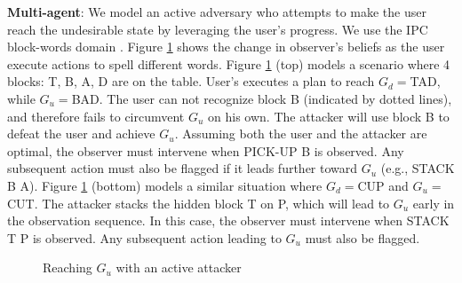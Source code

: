 \textbf{Multi-agent}: 
We model an active adversary who attempts to make the user reach the undesirable state by leveraging the user's progress. We use the IPC block-words domain  \cite{gupta1992bw}. Figure \ref{fig:multi} shows the change in observer's beliefs as the user execute actions to spell different words. Figure \ref{fig:multi} (top) models a  scenario where 4 blocks: T, B, A, D are on the table. User's executes a plan to reach  $G_d=$TAD, while $G_u=$BAD. The user can not recognize block B (indicated by dotted lines), and therefore fails to circumvent $G_u$ on his own. The attacker will use block B to defeat the user and achieve $G_u$. Assuming both the user and the attacker are optimal, the observer must intervene when PICK-UP B is observed. Any subsequent action must also be flagged if it leads further toward $G_u$ (e.g., STACK B A). Figure \ref{fig:multi} (bottom) models a similar situation where $G_d=$CUP and $G_u=$CUT. The attacker stacks the hidden block T on P, which will lead to $G_u$ early in the observation sequence. In this case, the observer must intervene when STACK T P is observed. Any subsequent action leading  to $G_u$ must also be flagged.

\begin{figure}[tb]
	\caption{Reaching $G_u$ with an active attacker}
	\label{fig:multi}
\end{figure}

